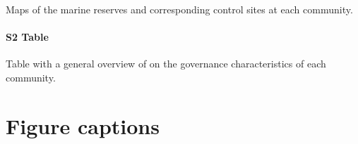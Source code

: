 \documentclass{frontiersSCNS}
\begin{document}
Maps of the marine reserves and corresponding control sites at each
community.

\paragraph*{S2 Table}
\label{S2_Table}

Table with a general overview of on the governance characteristics of
each community.



\section*{Figure captions}
\end{document}
